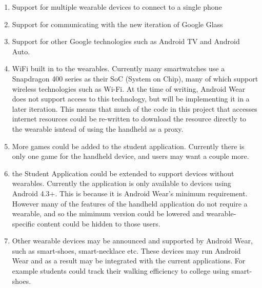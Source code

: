 \begin{enumerate}
\item Support for multiple wearable devices to connect to a single phone
\item Support for communicating with the new iteration of Google Glass
\item Support for other Google technologies such as Android TV and Android Auto.
\item WiFi built in to the wearables. Currently many smartwatches use a
    Snapdragon 400 series as their SoC (System on Chip), many of which support
    wireless technologies such as Wi-Fi. At the time of writing, Android Wear
    does not support access to this technology, but will be implementing it in
    a later iteration. This means that much of the code in this project that
    accesses internet resources could be re-written to download the resource
    directly to the wearable isntead of using the handheld as a proxy.
\item More games could be added to the student application. Currently there is
    only one game for the handheld device, and users may want a couple more.
\item the Student Application could be extended to support devices without
    wearables. Currently the application is only available to devices using 
    Android 4.3+. This is because it is Android Wear's minimum requirement.
    However many of the features of the handheld application do not require
    a wearable, and so the mimimum version could be lowered and
    wearable-specific content could be hidden to those users.
\item Other wearable devices may be announced and supported by Android Wear,
    such as smart-shoes, smart-necklace etc. These devices may run Android Wear
    and as a result may be integrated with the current applications. For example
    students could track their walking efficiency to college using smart-shoes.
\end{enumerate}
